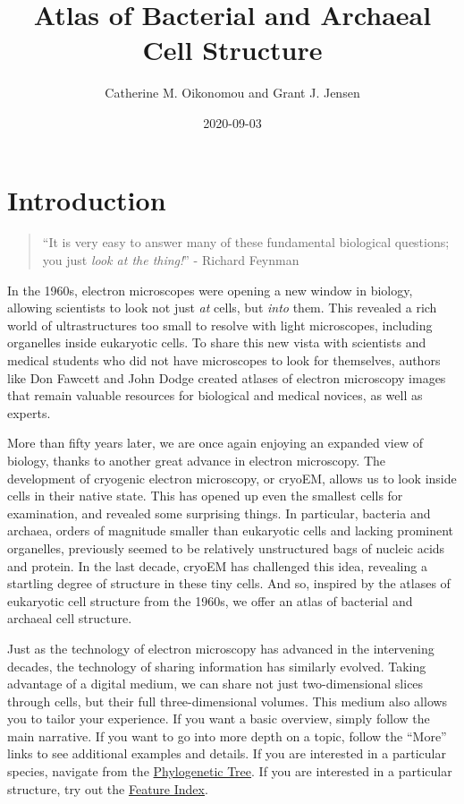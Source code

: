 \documentclass[]{tufte-book}
\title{Atlas of Bacterial and Archaeal Cell Structure}
\author{Catherine M. Oikonomou and Grant J. Jensen}
\date{2020-09-03}
\begin{document}
\maketitle



{
\setcounter{tocdepth}{1}
\tableofcontents
}

\hypertarget{introduction}{%
\chapter*{Introduction}\label{introduction}}

\begin{quote}
``It is very easy to answer many of these fundamental biological questions; you just \emph{look at the thing!}''
- Richard Feynman \citep{feynman1960}
\end{quote}

In the 1960s, electron microscopes were opening a new window in biology, allowing scientists to look not just \emph{at} cells, but \emph{into} them. This revealed a rich world of ultrastructures too small to resolve with light microscopes, including organelles inside eukaryotic cells. To share this new vista with scientists and medical students who did not have microscopes to look for themselves, authors like Don Fawcett \citep{fawcett1966} and John Dodge \citep{dodge1968} created atlases of electron microscopy images that remain valuable resources for biological and medical novices, as well as experts.

More than fifty years later, we are once again enjoying an expanded view of biology, thanks to another great advance in electron microscopy. The development of cryogenic electron microscopy, or cryoEM, allows us to look inside cells in their native state. This has opened up even the smallest cells for examination, and revealed some surprising things. In particular, bacteria and archaea, orders of magnitude smaller than eukaryotic cells and lacking prominent organelles, previously seemed to be relatively unstructured bags of nucleic acids and protein. In the last decade, cryoEM has challenged this idea, revealing a startling degree of structure in these tiny cells. And so, inspired by the atlases of eukaryotic cell structure from the 1960s, we offer an atlas of bacterial and archaeal cell structure.

Just as the technology of electron microscopy has advanced in the intervening decades, the technology of sharing information has similarly evolved. Taking advantage of a digital medium, we can share not just two-dimensional slices through cells, but their full three-dimensional volumes. This medium also allows you to tailor your experience. If you want a basic overview, simply follow the main narrative. If you want to go into more depth on a topic, follow the ``More'' links to see additional examples and details. If you are interested in a particular species, navigate from the \protect\hyperlink{tree}{Phylogenetic Tree}. If you are interested in a particular structure, try out the \protect\hyperlink{feature-index}{Feature Index}.
\end{document}

